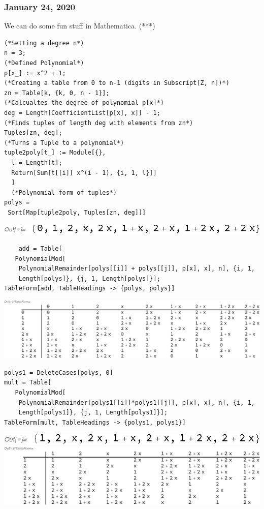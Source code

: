\subsubsection*{January 24, 2020}

We can do some fun stuff in Mathematica. (***)

\begin{verbatim}
(*Setting a degree n*)
n = 3;
(*Defined Polynomial*)
p[x_] := x^2 + 1;
(*Creating a table from 0 to n-1 (digits in Subscript[Z, n])*)
zn = Table[k, {k, 0, n - 1}];
(*Calcualtes the degree of polynomial p[x]*)
deg = Length[CoefficientList[p[x], x]] - 1;
(*Finds tuples of length deg with elements from zn*)
Tuples[zn, deg];
(*Turns a Tuple to a polynomial*)
tuple2poly[t_] := Module[{},
  l = Length[t];
  Return[Sum[t[[i]] x^(i - 1), {i, 1, l}]]
  ]
  (*Polynomial form of tuples*)
polys = 
 Sort[Map[tuple2poly, Tuples[zn, deg]]]
\end{verbatim}
\includegraphics{notebooks/quotientrings/gr7.eps}
\begin{verbatim}
	add = Table[
   PolynomialMod[
    PolynomialRemainder[polys[[i]] + polys[[j]], p[x], x], n], {i, 1, 
    Length[polys]}, {j, 1, Length[polys]}];
TableForm[add, TableHeadings -> {polys, polys}]
\end{verbatim}
\includegraphics[width=\textwidth]{notebooks/quotientrings/gr9.eps}
\begin{verbatim}
polys1 = DeleteCases[polys, 0]
mult = Table[
   PolynomialMod[
    PolynomialRemainder[polys1[[i]]*polys1[[j]], p[x], x], n], {i, 1, 
    Length[polys1]}, {j, 1, Length[polys1]}];
TableForm[mult, TableHeadings -> {polys1, polys1}]
\end{verbatim}
\includegraphics{notebooks/quotientrings/gr11.eps} \\

\includegraphics[width=\textwidth]{notebooks/quotientrings/gr12.eps}

